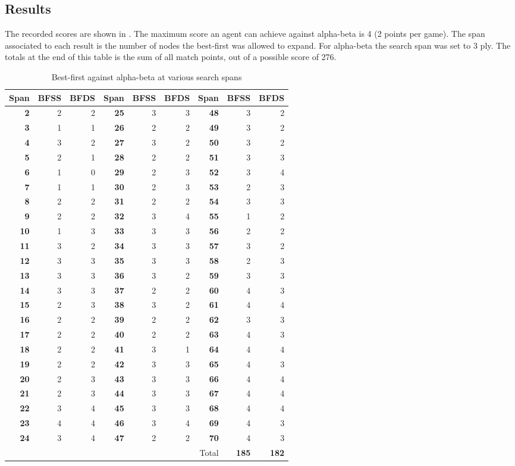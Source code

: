 \subsection*{Results}
The recorded scores are shown in .  The maximum score an agent can achieve against alpha-beta is 4 (2 points per game).  The span associated to each result is the number of nodes the best-first was allowed to expand.  For alpha-beta the search span was set to 3 ply.  The totals at the end of this table is the sum of all match points, out of a possible score of 276.   
\begin{table}[ht!]
	\caption{Best-first against alpha-beta at various search spans}
	\center
	\small
		\begin{tabular}{|r|r|r||r|r|r||r|r|r|}
		\hline
		\bf Span & \bf BFSS & \bf BFDS & \bf Span & \bf BFSS & \bf BFDS & \bf Span & \bf BFSS & \bf BFDS \\
		\hline
\bf 2 & 2 & 2 & \bf 25 & 3 & 3 & \bf 48 & 3 & 2 \\
\bf 3 & 1 & 1 & \bf 26 & 2 & 2 & \bf 49 & 3 & 2 \\
\bf 4 & 3 & 2 & \bf 27 & 3 & 2 & \bf 50 & 3 & 2 \\
\bf 5 & 2 & 1 & \bf 28 & 2 & 2 & \bf 51 & 3 & 3 \\
\bf 6 & 1 & 0 & \bf 29 & 2 & 3 & \bf 52 & 3 & 4 \\
\bf 7 & 1 & 1 & \bf 30 & 2 & 3 & \bf 53 & 2 & 3 \\
\bf 8 & 2 & 2 & \bf 31 & 2 & 2 & \bf 54 & 3 & 3 \\
\bf 9 & 2 & 2 & \bf 32 & 3 & 4 & \bf 55 & 1 & 2 \\
\bf 10 & 1 & 3 & \bf 33 & 3 & 3 & \bf 56 & 2 & 2 \\
\bf 11 & 3 & 2 & \bf 34 & 3 & 3 & \bf 57 & 3 & 2 \\
\bf 12 & 3 & 3 & \bf 35 & 3 & 3 & \bf 58 & 2 & 3 \\
\bf 13 & 3 & 3 & \bf 36 & 3 & 2 & \bf 59 & 3 & 3 \\
\bf 14 & 3 & 3 & \bf 37 & 2 & 2 & \bf 60 & 4 & 3 \\
\bf 15 & 2 & 3 & \bf 38 & 3 & 2 & \bf 61 & 4 & 4 \\
\bf 16 & 2 & 2 & \bf 39 & 2 & 2 & \bf 62 & 3 & 3 \\
\bf 17 & 2 & 2 & \bf 40 & 2 & 2 & \bf 63 & 4 & 3 \\
\bf 18 & 2 & 2 & \bf 41 & 3 & 1 & \bf 64 & 4 & 4 \\
\bf 19 & 2 & 2 & \bf 42 & 3 & 3 & \bf 65 & 4 & 3 \\
\bf 20 & 2 & 3 & \bf 43 & 3 & 3 & \bf 66 & 4 & 4 \\
\bf 21 & 2 & 3 & \bf 44 & 3 & 3 & \bf 67 & 4 & 4 \\
\bf 22 & 3 & 4 & \bf 45 & 3 & 3 & \bf 68 & 4 & 4 \\
\bf 23 & 4 & 4 & \bf 46 & 3 & 4 & \bf 69 & 4 & 3 \\
\bf 24 & 3 & 4 & \bf 47 & 2 & 2 & \bf 70 & 4 & 3 \\
\hline
& & & & & & Total & \bf 185 & \bf 182 \\
		\hline
		\end{tabular}
	\label{tab:tree-ab-bffs}
\end{table}


